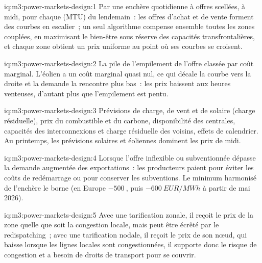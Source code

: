 \begin{solution}{iq:m3:power-markets-design:1}
Par une enchère quotidienne à offres scellées, à midi, pour chaque  (MTU) du lendemain~: les offres d'achat et de vente forment
des courbes en escalier~; un seul algorithme compense ensemble toutes les zones couplées, en maximisant le bien-être sous
réserve des capacités transfrontalières, et chaque zone obtient un prix uniforme au point où ses courbes se croisent.
\end{solution}

\begin{solution}{iq:m3:power-markets-design:2}
La pile de l'empilement de l'offre classée par coût marginal. L'éolien a un coût marginal quasi nul, ce qui décale la
courbe vers la droite et la demande la rencontre plus bas~: les prix baissent aux heures venteuses, d'autant plus que
l'empilement est pentu.
\end{solution}

\begin{solution}{iq:m3:power-markets-design:3}
Prévisions de charge, de vent et de solaire (charge résiduelle), prix du combustible et du carbone, disponibilité des centrales,
capacités des interconnexions et charge résiduelle des voisins, effets de calendrier. Au printemps, les prévisions solaires
et éoliennes dominent les prix de midi.
\end{solution}

\begin{solution}{iq:m3:power-markets-design:4}
Lorsque l'offre inflexible ou subventionnée dépasse la demande augmentée des exportations~: les producteurs paient pour éviter
les coûts de redémarrage ou pour conserver les subventions. Le minimum harmonisé de l'enchère le borne (en Europe
$-\qty{500}{}$, puis $-\qty{600}{EUR/MWh}$ à partir de mai 2026).
\end{solution}

\begin{solution}{iq:m3:power-markets-design:5}
Avec une tarification zonale, il reçoit le prix de la zone quelle que soit la congestion locale, mais peut être
écrêté par le redispatching~; avec une tarification nodale, il reçoit le prix de son nœud, qui baisse lorsque
les lignes locales sont congestionnées, il supporte donc le risque de congestion et a besoin de droits de transport pour
se couvrir.
\end{solution}

